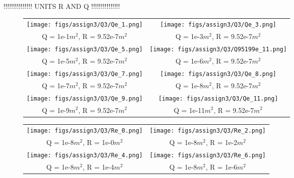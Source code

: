 \documentclass[a4paper]{article}
\newcommand{\newpar}{\vspace{.3cm}\noindent}
\begin{document}
\newpar
!!!!!!!!!!!!!!! UNITS R AND Q !!!!!!!!!!!!!!!

\begin{figure}[H]
\begin{adjustwidth}{-3cm}{-3cm}
\centering
\begin{tabular}{cc}
  \texttt{[image: figs/assign3/Q3/Qe\_1.png]} &   \texttt{[image: figs/assign3/Q3/Qe\_3.png]} \\
  Q = 1e-1\(m^2\), R = 9.52e-7\(m^2\) & Q = 1e-3\(m^2\), R = 9.52e-7\(m^2\) \\[8pt]
  \texttt{[image: figs/assign3/Q3/Qe\_5.png]} & \texttt{[image: figs/assign3/Q3/Q95199e\_11.png]} \\
  Q = 1e-5\(m^2\), R = 9.52e-7\(m^2\) & Q = 1e-6\(m^2\), R = 9.52e-7\(m^2\) \\[8pt]
  \texttt{[image: figs/assign3/Q3/Qe\_7.png]} & \texttt{[image: figs/assign3/Q3/Qe\_8.png]} \\
  Q = 1e-7\(m^2\), R = 9.52e-7\(m^2\) & Q = 1e-8\(m^2\), R = 9.52e-7\(m^2\) \\[8pt]
  \texttt{[image: figs/assign3/Q3/Qe\_9.png]} & \texttt{[image: figs/assign3/Q3/Qe\_11.png]}\\
  Q = 1e-9\(m^2\), R = 9.52e-7\(m^2\) & Q = 1e-11\(m^2\), R = 9.52e-7\(m^2\)
\end{tabular}
\end{adjustwidth}
\label{fig:QcteR}
\end{figure}


\begin{figure}[H]
\begin{adjustwidth}{-3cm}{-3cm}
\centering
\begin{tabular}{cc}
  \texttt{[image: figs/assign3/Q3/Re\_0.png]} &   \texttt{[image: figs/assign3/Q3/Re\_2.png]} \\
  Q = 1e-8\(m^2\), R = 1e-0\(m^2\) & Q = 1e-8\(m^2\), R = 1e-2\(m^2\) \\[8pt]
 \texttt{[image: figs/assign3/Q3/Re\_4.png]} &   \texttt{[image: figs/assign3/Q3/Re\_6.png]} \\
 Q = 1e-8\(m^2\), R = 1e-4\(m^2\) & Q = 1e-8\(m^2\), R = 1e-6\(m^2\) \\[8pt]
\end{tabular}
\end{adjustwidth}
\label{fig:cteQR}
\end{figure}
\end{document}
